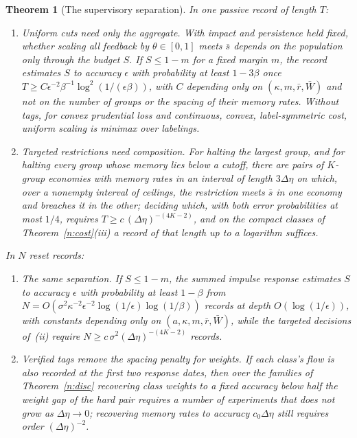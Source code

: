 \documentclass[11pt,letterpaper]{article}
\newtheorem{theorem}{Theorem}[section]
\theoremstyle{definition}
\begin{document}
\begin{theorem}[The supervisory separation]\label{n:separation}
\emph{In one passive record of length $T$:}
\begin{enumerate}
  \item[(i)] \emph{Uniform cuts need only the aggregate.} With impact and persistence held fixed, whether scaling all feedback by $\theta \in [0, 1]$ meets $\bar s$ depends on the population only through the budget $S$. If $S \le 1 - m$ for a fixed margin $m$, the record estimates $S$ to accuracy $\epsilon$ with probability at least $1 - 3\beta$ once $T \ge C\epsilon^{-2}\beta^{-1}\log^2(1/(\epsilon\beta))$, with $C$ depending only on $(\kappa, m, \bar r, \bar W)$ and not on the number of groups or the spacing of their memory rates. Without tags, for convex prudential loss and continuous, convex, label-symmetric cost, uniform scaling is minimax over labelings.
  \item[(ii)] \emph{Targeted restrictions need composition.} For halting the largest group, and for halting every group whose memory lies below a cutoff, there are pairs of $K$-group economies with memory rates in an interval of length $3\Delta\eta$ on which, over a nonempty interval of ceilings, the restriction meets $\bar s$ in one economy and breaches it in the other; deciding which, with both error probabilities at most $1/4$, requires $T \ge c\,(\Delta\eta)^{-(4K-2)}$, and on the compact classes of Theorem~\ref{n:cost}(iii) a record of that length up to a logarithm suffices.
\end{enumerate}
\emph{In $N$ reset records:}
\begin{enumerate}
  \item[(iii)] \emph{The same separation.} If $S \le 1 - m$, the summed impulse response estimates $S$ to accuracy $\epsilon$ with probability at least $1 - \beta$ from $N = O(\sigma^2 \kappa^{-2} \epsilon^{-2} \log(1/\epsilon) \log(1/\beta))$ records at depth $O(\log(1/\epsilon))$, with constants depending only on $(a, \kappa, m, \bar r, \bar W)$, while the targeted decisions of~(ii) require $N \ge c\, \sigma^2 (\Delta\eta)^{-(4K-2)}$ records.
  \item[(iv)] \emph{Verified tags remove the spacing penalty for weights.} If each class's flow is also recorded at the first two response dates, then over the families of Theorem~\ref{n:disc} recovering class weights to a fixed accuracy below half the weight gap of the hard pair requires a number of experiments that does not grow as $\Delta\eta \to 0$; recovering memory rates to accuracy $c_0 \Delta\eta$ still requires order $(\Delta\eta)^{-2}$.
\end{enumerate}
\end{theorem}
\end{document}
